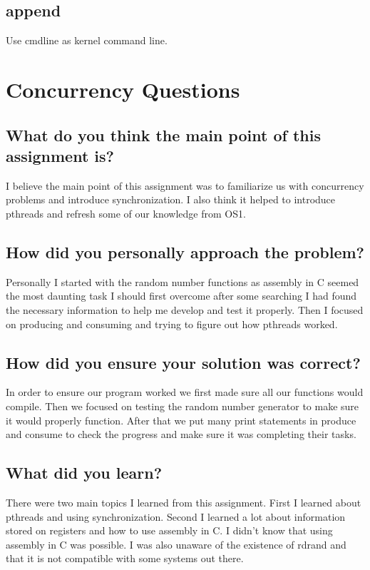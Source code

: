 \documentclass[10pt,letterpaper,onecolumn,draftclsnofoot]{IEEEtran}
\begin{document}
\subsection{append}
Use cmdline as kernel command line.

\section{Concurrency Questions}
\subsection{What do you think the main point of this assignment is?}
I believe the main point of this assignment was to familiarize us with 
concurrency problems and introduce synchronization. I also think it helped to 
introduce pthreads and refresh some of our knowledge from OS1.

\subsection{How did you personally approach the problem?}
Personally I started with the random number functions as assembly in C seemed 
the most daunting task I should first overcome after some searching I had found 
the necessary information to help me develop and test it properly. Then I 
focused on producing and consuming and trying to figure out how pthreads worked.

\subsection{How did you ensure your solution was correct?}
In order to ensure our program worked we first made sure all our functions 
would compile. Then we focused on testing the random number generator to make 
sure it would properly function. After that we put many print statements in 
produce and consume to check the progress and make sure it was completing their tasks.

\subsection{What did you learn?}
There were two main topics I learned from this assignment. First I learned 
about pthreads and using synchronization. Second I learned a lot about 
information stored on registers and how to use assembly in C. I didn’t know 
that using assembly in C was possible. I was also unaware of the existence of 
rdrand and that it is not compatible with some systems out there.
\end{document}
